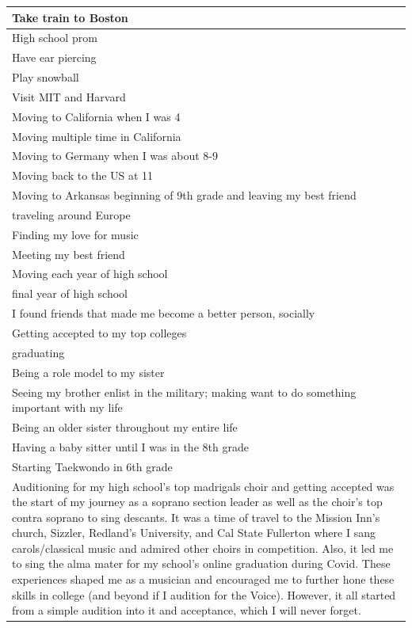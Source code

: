 \documentclass[
  .7em,
  letterpaper,
  DIV=11,
  numbers=noendperiod]{scrartcl}
\begin{document}
\begin{table}
\begin{tabular}{l}
\hline
Take train to Boston\\
\hline
High school prom\\
\hline
Have ear piercing\\
\hline
Play snowball\\
\hline
Visit MIT and Harvard\\
\hline
Moving to California when I was 4\\
\hline
Moving multiple time in California\\
\hline
Moving to Germany when I was about 8-9\\
\hline
Moving back to the US at 11\\
\hline
Moving to Arkansas beginning of 9th grade and leaving my best friend\\
\hline
traveling around Europe\\
\hline
Finding my love for music\\
\hline
Meeting my best friend\\
\hline
Moving each year of high school\\
\hline
final year of high school\\
\hline
I found friends that made me become a better person, socially\\
\hline
Getting accepted to my top colleges\\
\hline
graduating\\
\hline
Being a role model to my sister\\
\hline
Seeing my brother enlist in the military; making want to do something important with my life\\
\hline
Being an older sister throughout my entire life\\
\hline
Having a baby sitter until I was in the 8th grade\\
\hline
Starting Taekwondo in 6th grade\\
\hline
Auditioning for my high school's top madrigals choir and getting accepted was the start of my journey as a soprano section leader as well as the choir's top contra soprano to sing descants. It was a time of travel to the Mission Inn's church, Sizzler, Redland's University, and Cal State Fullerton where I sang carols/classical music and admired other choirs in competition. Also, it led me to sing the alma mater for my school's online graduation during Covid. These experiences shaped me as a musician and encouraged me to further hone these skills in college (and beyond if I audition for the Voice). However, it all started from a simple audition into it and acceptance, which I will never forget.\\

\end{tabular}
\end{table}
\end{document}
